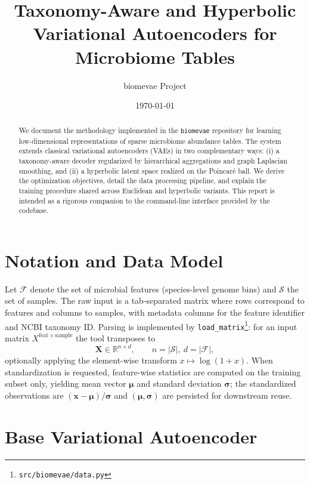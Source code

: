 \documentclass[11pt]{article}
\title{Taxonomy-Aware and Hyperbolic Variational Autoencoders for Microbiome Tables}
\author{biomevae Project}
\date{\today}
\begin{document}
\maketitle
\begin{abstract}
We document the methodology implemented in the \texttt{biomevae} repository for learning
low-dimensional representations of sparse microbiome abundance tables.
The system extends classical variational autoencoders (VAEs) in two complementary
ways: (i) a taxonomy-aware decoder regularized by hierarchical aggregations and graph
Laplacian smoothing, and (ii) a hyperbolic latent space realized on the Poincar\'e ball.
We derive the optimization objectives, detail the data processing pipeline, and explain
the training procedure shared across Euclidean and hyperbolic variants. This report is
intended as a rigorous companion to the command-line interface provided by the codebase.
\end{abstract}
\section{Notation and Data Model}
Let $\mathcal{F}$ denote the set of microbial features (species-level genome bins) and
$\mathcal{S}$ the set of samples. The raw input is a tab-separated matrix where rows
correspond to features and columns to samples, with metadata columns for the feature
identifier and NCBI taxonomy ID. Parsing is implemented by \texttt{load\_matrix}\footnote{\texttt{src/biomevae/data.py}}:
for an input matrix $X^{\mathrm{feat}\times \mathrm{sample}}$ the tool transposes to
\begin{equation}
    \bm{X} \in \mathbb{R}^{n \times d}, \qquad n = |\mathcal{S}|,~ d = |\mathcal{F}|,
\end{equation}
optionally applying the element-wise transform $x \mapsto \log(1+x)$.
When standardization is requested, feature-wise statistics are computed on the
training subset only, yielding mean vector $\bm{\mu}$ and standard deviation
$\bm{\sigma}$; the standardized observations are $(\bm{x}-\bm{\mu})/\bm{\sigma}$ and
$(\bm{\mu},\bm{\sigma})$ are persisted for downstream reuse.
\section{Base Variational Autoencoder}
\end{document}

